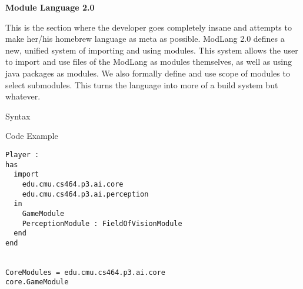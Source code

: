 \documentclass[11pt]{article}
\begin{document}
\begin{center}\vspace*{12pt}\textbf{\LARGE Module Language 2.0} \end{center}
This is the section where the developer goes completely insane and attempts to make her/his homebrew language as meta as possible. ModLang 2.0 defines a new, unified system of importing and using modules. This system allows the user to import and use files of the ModLang as modules themselves, as well as using java packages as modules. We also formally define and use scope of modules to select submodules. This turns the language into more of a build system but whatever. 
\setcounter{section}{0}
\begin{section}{Syntax}
\begin{subsection}{Code Example}
\begin{verbatim}
Player : 
has
  import 
    edu.cmu.cs464.p3.ai.core
    edu.cmu.cs464.p3.ai.perception
  in 
    GameModule
    PerceptionModule : FieldOfVisionModule
  end
end


CoreModules = edu.cmu.cs464.p3.ai.core
core.GameModule 
\end{verbatim} 
  
\end{subsection}
\end{section}
\end{document}
